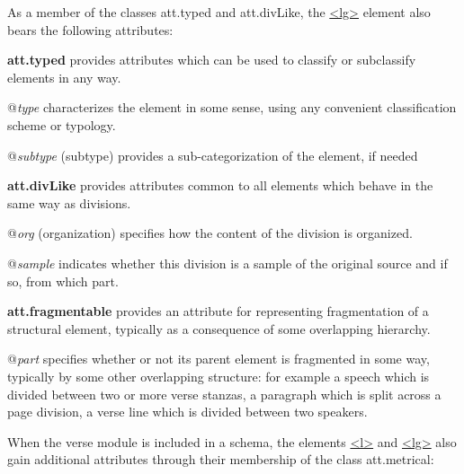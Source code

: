 \par
As a member of the classes \textsf{att.typed} and \textsf{att.divLike}, the \hyperref[TEI.lg]{<lg>} element also bears the following attributes: 
\begin{sansreflist}
  
\item [\textbf{att.typed}] provides attributes which can be used to classify or subclassify elements in any way.\hfil\\[-10pt]\begin{sansreflist}
    \item[@{\itshape type}]
  characterizes the element in some sense, using any convenient classification scheme or typology.
    \item[@{\itshape subtype}]
  (subtype) provides a sub-categorization of the element, if needed
\end{sansreflist}  
\item [\textbf{att.divLike}] provides attributes common to all elements which behave in the same way as divisions.\hfil\\[-10pt]\begin{sansreflist}
    \item[@{\itshape org}]
  (organization) specifies how the content of the division is organized.
    \item[@{\itshape sample}]
  indicates whether this division is a sample of the original source and if so, from which part.
\end{sansreflist}  
\item [\textbf{att.fragmentable}] provides an attribute for representing fragmentation of a structural element, typically as a consequence of some overlapping hierarchy.\hfil\\[-10pt]\begin{sansreflist}
    \item[@{\itshape part}]
  specifies whether or not its parent element is fragmented in some way, typically by some other overlapping structure: for example a speech which is divided between two or more verse stanzas, a paragraph which is split across a page division, a verse line which is divided between two speakers.
\end{sansreflist}  
\end{sansreflist}
\par
When the \textsf{verse} module is included in a schema, the elements \hyperref[TEI.l]{<l>} and \hyperref[TEI.lg]{<lg>} also gain additional attributes through their membership of the class \textsf{att.metrical}: 
